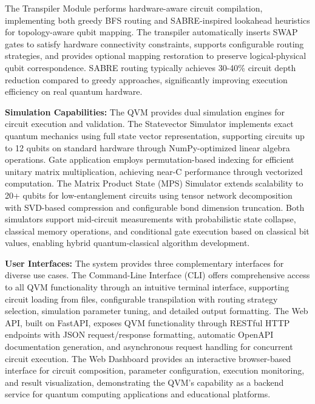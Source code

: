 The Transpiler Module performs hardware-aware circuit compilation, implementing both greedy BFS routing and SABRE-inspired lookahead heuristics for topology-aware qubit mapping. The transpiler automatically inserts SWAP gates to satisfy hardware connectivity constraints, supports configurable routing strategies, and provides optional mapping restoration to preserve logical-physical qubit correspondence. SABRE routing typically achieves 30-40\% circuit depth reduction compared to greedy approaches, significantly improving execution efficiency on real quantum hardware.

\textbf{Simulation Capabilities:} The QVM provides dual simulation engines for circuit execution and validation. The Statevector Simulator implements exact quantum mechanics using full state vector representation, supporting circuits up to 12 qubits on standard hardware through NumPy-optimized linear algebra operations. Gate application employs permutation-based indexing for efficient unitary matrix multiplication, achieving near-C performance through vectorized computation. The Matrix Product State (MPS) Simulator extends scalability to 20+ qubits for low-entanglement circuits using tensor network decomposition with SVD-based compression and configurable bond dimension truncation. Both simulators support mid-circuit measurements with probabilistic state collapse, classical memory operations, and conditional gate execution based on classical bit values, enabling hybrid quantum-classical algorithm development.

\textbf{User Interfaces:} The system provides three complementary interfaces for diverse use cases. The Command-Line Interface (CLI) offers comprehensive access to all QVM functionality through an intuitive terminal interface, supporting circuit loading from files, configurable transpilation with routing strategy selection, simulation parameter tuning, and detailed output formatting. The Web API, built on FastAPI, exposes QVM functionality through RESTful HTTP endpoints with JSON request/response formatting, automatic OpenAPI documentation generation, and asynchronous request handling for concurrent circuit execution. The Web Dashboard provides an interactive browser-based interface for circuit composition, parameter configuration, execution monitoring, and result visualization, demonstrating the QVM's capability as a backend service for quantum computing applications and educational platforms.

